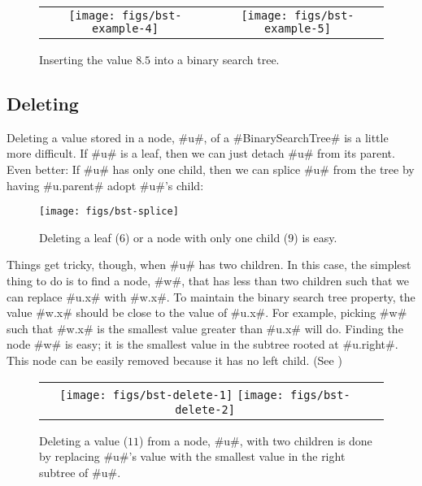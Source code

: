 \begin{figure}
  \begin{center}
    \begin{tabular}{cc}
    \texttt{[image: figs/bst-example-4]} &
    \texttt{[image: figs/bst-example-5]} 
    \end{tabular}
  \end{center}
  \caption{Inserting the value $8.5$ into a binary search tree.}
\end{figure}


\subsection{Deleting}

Deleting a value stored in a node, #u#, of a #BinarySearchTree# is a
little more difficult.  If #u# is a leaf, then we can just detach #u#
from its parent.  Even better: If #u# has only one child, then we can
splice #u# from the tree by having #u.parent# adopt #u#'s child:

\begin{figure}
  \begin{center}
    \texttt{[image: figs/bst-splice]}
  \end{center}
  \caption{Deleting a leaf ($6$) or a node with only one child ($9$) is easy.}
\end{figure}

Things get tricky, though, when #u# has two children.  In this case,
the simplest thing to do is to find a node, #w#, that has less than
two children such that we can replace #u.x# with #w.x#.  To maintain
the binary search tree property, the value #w.x# should be close to the
value of #u.x#.  For example, picking #w# such that #w.x# is the smallest
value greater than #u.x# will do.  Finding the node #w# is easy; it is
the smallest value in the subtree rooted at #u.right#.  This node can
be easily removed because it has no left child.  (See )

\begin{figure}
  \begin{center}
    \begin{tabular}{cc}
    \texttt{[image: figs/bst-delete-1]}
    \texttt{[image: figs/bst-delete-2]}
    \end{tabular}
  \end{center}
  \caption[Deleting from a BinarySearchTree]{Deleting a value ($11$) from a node, #u#, with two children is done by replacing #u#'s value with the smallest value in the right subtree of #u#.}
\end{figure}

